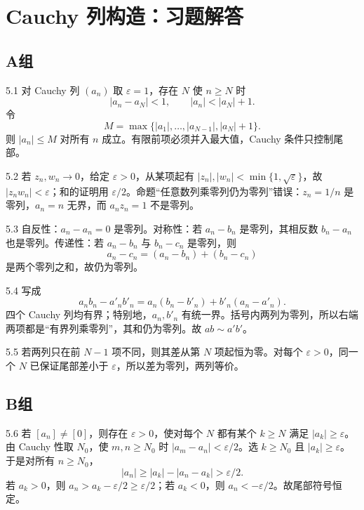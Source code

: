 \chapter{Cauchy 列构造：习题解答}

\section*{A组}

\begin{solution}{5.1}
对 Cauchy 列 \((a_n)\) 取 \(\varepsilon=1\)，存在 \(N\) 使 \(n\ge N\) 时
\[
 |a_n-a_N|<1,\qquad |a_n|<|a_N|+1.
\]
令
\[
 M=\max\{|a_1|,\ldots,|a_{N-1}|,|a_N|+1\}.
\]
则 \(|a_n|\le M\) 对所有 \(n\) 成立。有限前项必须并入最大值，Cauchy 条件只控制尾部。
\end{solution}

\begin{solution}{5.2}
若 \(z_n,w_n\to0\)，给定 \(\varepsilon>0\)，从某项起有 \(|z_n|,|w_n|<\min\{1,\sqrt{\varepsilon}\}\)，故 \(|z_nw_n|<\varepsilon\)；和的证明用 \(\varepsilon/2\)。命题“任意数列乘零列仍为零列”错误：\(z_n=1/n\) 是零列，\(a_n=n\) 无界，而 \(a_nz_n=1\) 不是零列。
\end{solution}

\begin{solution}{5.3}
自反性：\(a_n-a_n=0\) 是零列。对称性：若 \(a_n-b_n\) 是零列，其相反数 \(b_n-a_n\) 也是零列。传递性：若 \(a_n-b_n\) 与 \(b_n-c_n\) 是零列，则
\[
 a_n-c_n=(a_n-b_n)+(b_n-c_n)
\]
是两个零列之和，故仍为零列。
\end{solution}

\begin{solution}{5.4}
写成
\[
 a_nb_n-a'_nb'_n=a_n(b_n-b'_n)+b'_n(a_n-a'_n).
\]
四个 Cauchy 列均有界；特别地，\(a_n,b'_n\) 有统一界。括号内两列为零列，所以右端两项都是“有界列乘零列”，其和仍为零列。故 \(ab\sim a'b'\)。
\end{solution}

\begin{solution}{5.5}
若两列只在前 \(N-1\) 项不同，则其差从第 \(N\) 项起恒为零。对每个 \(\varepsilon>0\)，同一个 \(N\) 已保证尾部差小于 \(\varepsilon\)，所以差为零列，两列等价。
\end{solution}

\section*{B组}

\begin{solution}{5.6}
若 \([a_n]\ne[0]\)，则存在 \(\varepsilon>0\)，使对每个 \(N\) 都有某个 \(k\ge N\) 满足 \(|a_k|\ge\varepsilon\)。由 Cauchy 性取 \(N_0\)，使 \(m,n\ge N_0\) 时 \(|a_m-a_n|<\varepsilon/2\)。选 \(k\ge N_0\) 且 \(|a_k|\ge\varepsilon\)。于是对所有 \(n\ge N_0\)，
\[
 |a_n|\ge|a_k|-|a_n-a_k|>\varepsilon/2.
\]
若 \(a_k>0\)，则 \(a_n>a_k-\varepsilon/2\ge\varepsilon/2\)；若 \(a_k<0\)，则 \(a_n<-\varepsilon/2\)。故尾部符号恒定。
\end{solution}

